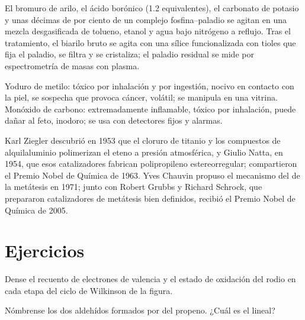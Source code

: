 \begin{inthelab}
El bromuro de arilo, el ácido borónico (1.2 equivalentes), el carbonato de potasio y unas
décimas de por ciento de un complejo fosfina--paladio se agitan en una
mezcla desgasificada de tolueno, etanol y agua bajo nitrógeno a reflujo. Tras
el tratamiento, el biarilo bruto se agita con una sílice funcionalizada con tioles que
fija el paladio, se filtra y se cristaliza; el paladio residual se mide por
espectrometría de masas con plasma.
\end{inthelab}

\begin{safety}{}
Yoduro de metilo: tóxico por inhalación y por ingestión, nocivo en contacto con la piel, se sospecha que
provoca cáncer, volátil; se manipula en una vitrina. Monóxido de carbono: extremadamente
inflamable, tóxico por inhalación, puede dañar al feto, inodoro; se usa
con detectores fijos y alarmas.
\end{safety}

\begin{history}
Karl Ziegler descubrió en 1953 que el cloruro de titanio y los compuestos de alquilaluminio
polimerizan el eteno a presión atmosférica, y Giulio Natta, en 1954, que esos
catalizadores fabrican polipropileno estereorregular; compartieron el Premio Nobel de
Química de 1963. Yves Chauvin propuso el mecanismo del  de la
metátesis en 1971; junto con Robert Grubbs y Richard Schrock, que prepararon catalizadores
de metátesis bien definidos, recibió el Premio Nobel de Química de 2005.
\end{history}

\section{Ejercicios}

\begin{exercise}[$\star$]\label{exo:b3:homogeneous-catalysis:1}
Dense el recuento de electrones de valencia y el estado de oxidación del rodio en cada etapa
del ciclo de Wilkinson de la figura.
\end{exercise}

\begin{exercise}[$\star$]\label{exo:b3:homogeneous-catalysis:2}
Nómbrense los dos aldehídos formados por  del propeno. ¿Cuál es el
lineal?
\end{exercise}

